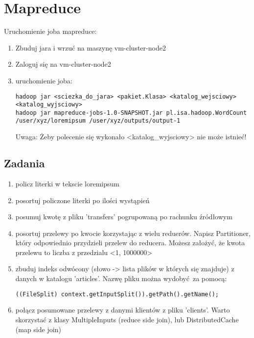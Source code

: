 \documentclass{article}
\begin{document}
\section*{Mapreduce}

Uruchomienie joba mapreduce:
\begin{enumerate}
\item Zbuduj jara i wrzuć na maszynę vm-cluster-node2
\item Zaloguj się na vm-cluster-node2
\item uruchomienie joba:
\begin{lstlisting}
hadoop jar <sciezka_do_jara> <pakiet.Klasa> <katalog_wejsciowy> <katalog_wyjsciowy>
hadoop jar mapreduce-jobs-1.0-SNAPSHOT.jar pl.isa.hadoop.WordCount /user/xyz/loremipsum /user/xyz/outputs/output-1
\end{lstlisting}

Uwaga: Żeby polecenie się wykonało <katalog\_wyjsciowy> nie może istnieć!
\end{enumerate}

\subsection*{Zadania}

\begin{enumerate}
\item policz literki w tekscie loremipsum
\item posortuj policzone literki po ilości wystąpień
\item posumuj kwotę z pliku 'transfers' pogrupowaną po rachunku źródłowym
\item posortuj przelewy po kwocie korzystając z wielu reduerów. Napisz Partitioner, który odpowiednio przydzieli przelew do reducera. Możesz założyć, że kwota przelewu to liczba z przedzialu <1, 1000000>
\item zbuduj indeks odwócony (słowo -> lista plików w których się znajduje) z danych w katalogu 'articles'. Nazwę pliku można wydobyć za pomocą:
\begin{lstlisting}
((FileSplit) context.getInputSplit()).getPath().getName();
\end{lstlisting}
\item połącz posumowane przelewy z danymi klientów z pliku 'clients'. Warto skorzystać z klasy MultipleInputs (reduce side join), lub DistributedCache (map side join)
\end{enumerate}
\end{document}

